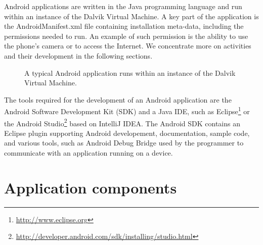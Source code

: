 Android applications are written in the Java programming language and run within an instance of the Dalvik Virtual Machine.
A key part of the application is the AndroidManifest\@.xml file containing installation meta-data, including the permissions needed to run.
An example of such permission is the ability to use the phone's camera or to access the Internet.
We concentrate more on activities and their development in the following sections. 
\begin{figure}[h!]
    \caption{A typical Android application runs within an instance of the Dalvik Virtual Machine.}
\end{figure}

The tools required for the development of an Android application are the Android Software Development Kit (SDK) and a Java IDE, such as Eclipse\footnote{\url{http://www.eclipse.org}} or the Android Studio\footnote{\url{http://developer.android.com/sdk/installing/studio.html}} based on IntelliJ IDEA. 
The Android SDK contains an Eclipse plugin supporting Android developement, documentation, sample code, and various tools, such as Android Debug Bridge used by the programmer to communicate with an application running on a device. 


\section{Application components}

